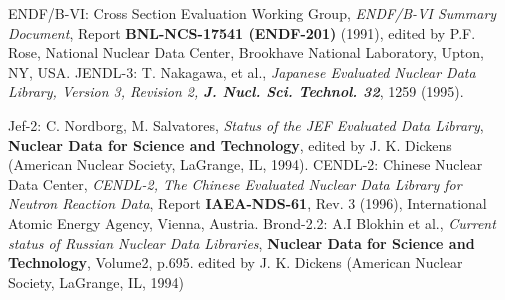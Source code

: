 \begin{thebibliography}{599}
 ENDF/B-VI: Cross Section Evaluation Working Group, {\it ENDF/B-VI Summary
Document}, Report {\bf BNL-NCS-17541 (ENDF-201)} (1991), edited by P.F. Rose,
National Nuclear Data Center, Brookhave National Laboratory, Upton, NY, USA.
 JENDL-3: T. Nakagawa, et al., {\it Japanese Evaluated Nuclear Data
Library, Version 3, Revision 2, \bf J. Nucl. Sci. Technol. 32}, 1259 (1995).
\item Jef-2: C. Nordborg, M. Salvatores, {\it Status of the JEF Evaluated Data
Library}, {\bf Nuclear Data for Science and Technology}, edited by J. K. Dickens
(American Nuclear Society, LaGrange, IL, 1994).
 CENDL-2: Chinese Nuclear Data Center, {\it CENDL-2, The Chinese Evaluated
Nuclear Data Library for Neutron Reaction Data}, Report {\bf IAEA-NDS-61}, Rev. 3
(1996), International Atomic Energy Agency, Vienna, Austria.
 Brond-2.2: A.I Blokhin et al., {\it Current status of Russian Nuclear
Data Libraries}, {\bf Nuclear Data for Science and Technology}, Volume2, p.695.
edited by J. K. Dickens (American Nuclear Society, LaGrange, IL, 1994)
\end{thebibliography}
